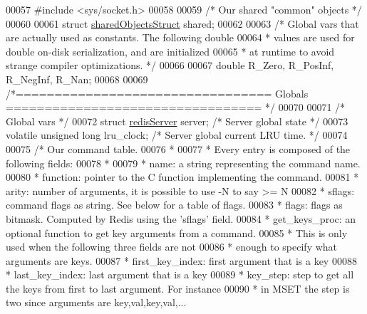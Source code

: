 \begin{DoxyCode}
00057 \textcolor{preprocessor}{#}\textcolor{preprocessor}{include} \textcolor{preprocessor}{<}\textcolor{preprocessor}{sys}\textcolor{preprocessor}{/}\textcolor{preprocessor}{socket}\textcolor{preprocessor}{.}\textcolor{preprocessor}{h}\textcolor{preprocessor}{>}
00058 
00059 \textcolor{comment}{/* Our shared "common" objects */}
00060 
00061 \textcolor{keyword}{struct} \hyperlink{structsharedObjectsStruct}{sharedObjectsStruct} shared;
00062 
00063 \textcolor{comment}{/* Global vars that are actually used as constants. The following double}
00064 \textcolor{comment}{ * values are used for double on-disk serialization, and are initialized}
00065 \textcolor{comment}{ * at runtime to avoid strange compiler optimizations. */}
00066 
00067 \textcolor{keywordtype}{double} R\_Zero, R\_PosInf, R\_NegInf, R\_Nan;
00068 
00069 \textcolor{comment}{/*================================= Globals ================================= */}
00070 
00071 \textcolor{comment}{/* Global vars */}
00072 \textcolor{keyword}{struct} \hyperlink{structredisServer}{redisServer} server; \textcolor{comment}{/* Server global state */}
00073 \textcolor{keyword}{volatile} \textcolor{keywordtype}{unsigned} \textcolor{keywordtype}{long} lru\_clock; \textcolor{comment}{/* Server global current LRU time. */}
00074 
00075 \textcolor{comment}{/* Our command table.}
00076 \textcolor{comment}{ *}
00077 \textcolor{comment}{ * Every entry is composed of the following fields:}
00078 \textcolor{comment}{ *}
00079 \textcolor{comment}{ * name: a string representing the command name.}
00080 \textcolor{comment}{ * function: pointer to the C function implementing the command.}
00081 \textcolor{comment}{ * arity: number of arguments, it is possible to use -N to say >= N}
00082 \textcolor{comment}{ * sflags: command flags as string. See below for a table of flags.}
00083 \textcolor{comment}{ * flags: flags as bitmask. Computed by Redis using the 'sflags' field.}
00084 \textcolor{comment}{ * get\_keys\_proc: an optional function to get key arguments from a command.}
00085 \textcolor{comment}{ *                This is only used when the following three fields are not}
00086 \textcolor{comment}{ *                enough to specify what arguments are keys.}
00087 \textcolor{comment}{ * first\_key\_index: first argument that is a key}
00088 \textcolor{comment}{ * last\_key\_index: last argument that is a key}
00089 \textcolor{comment}{ * key\_step: step to get all the keys from first to last argument. For instance}
00090 \textcolor{comment}{ *           in MSET the step is two since arguments are key,val,key,val,...}

\end{DoxyCode}
